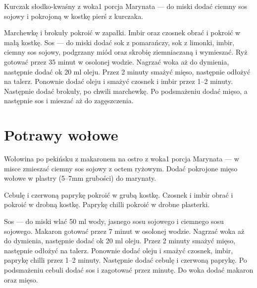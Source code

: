 \documentclass[a4paper,12pt]{article}
\begin{document}
\begin{recipe}{Kurczak słodko-kwaśny z woka}{1 porcja}{}
Marynata --- do miski dodać ciemny sos sojowy i pokrojoną w kostkę pierś z
kurczaka.

Marchewkę i brokuły pokroić w zapałki. Imbir oraz czosnek obrać i pokroić w małą
kostkę. 
Sos --- do miski dodać sok z pomarańczy, sok z limonki, imbir, ciemny sos
sojowy, podgrzany miód oraz skrobię ziemniaczaną i wymieszać.
Ryż gotować przez 35 minut w osolonej wodzie.
\freeform%
Nagrzać woka aż do dymienia, następnie dodać ok 20 ml oleju. Przez 2 minuty
smażyć mięso, następnie odłożyć na talerz. Ponownie dodać oleju i smażyć
czosnek i imbir przez 1--2 minuty. Następnie dodać brokuły, po chwili
marchewkę. Po podsmażeniu dodać mięso, a następnie sos i mieszać aż do
zagęszczenia.

\end{recipe}

\section{Potrawy wołowe}

\begin{recipe}{Wołowina po pekińsku z makaronem na ostro z woka}{1 porcja}{}
Marynata --- w misce zmieszać ciemny sos sojowy z octem ryżowym. Dodać
pokrojone mięso wołowe w plastry (5--7mm grubości) do marynaty.

Cebulę i czerwoną paprykę pokroić w grubą kostkę. Czosnek i imbir obrać i
pokroić w drobną kostkę. Paprykę chilli pokroić w drobne plasterki.

Sos --- do miski wlać 50 ml wody, jasnego sosu sojowego i ciemnego sosu sojowego. 
Makaron gotować przez 7 minut w osolonej wodzie.
\freeform%
Nagrzać woka aż do dymienia, następnie dodać ok 20 ml oleju. Przez 2 minuty
smażyć mięso, następnie odłożyć na talerz. Ponownie dodać oleju i smażyć
czosnek, imbir, paprykę chilli przez 1--2 minuty. Następnie dodać cebulę i
czerwoną paprykę. Po podsmażeniu cebuli dodać sos i zagotować przez minutę. Do
woka dodać makaron oraz mięso.

\end{recipe}

\newpage
\end{document}
